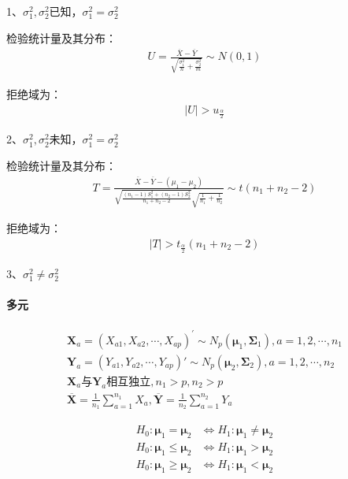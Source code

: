 \documentclass[12pt]{book}
\begin{document}
1、$\sigma_1^2,\sigma_2^2$已知，$\sigma_1^2=\sigma_2^2$

检验统计量及其分布：
\begin{gather*}
    U=\frac{\overline{X}-\overline{Y}}{\sqrt{\frac{\sigma_1^2}{n}+\frac{\sigma_2^2}{m}}}\sim N(0,1)
\end{gather*}


拒绝域为：
\begin{gather*}
    \left|U\right|>u_{\frac{\alpha}{2}}
\end{gather*}


2、$\sigma_1^2,\sigma_2^2$未知，$\sigma_1^2=\sigma_2^2$

检验统计量及其分布：
\begin{gather*}
    T=\frac{\overline{X}-\overline{Y}-(\mu_1-\mu_2)}{\sqrt{\frac{\left(n_1-1\right)S_1^2+\left(n_2-1\right)S_2^2}{n_1+n_2-2}}\sqrt{\frac{1}{n_1}+\frac{1}{n_2}}}\sim t(n_1+n_2-2)
\end{gather*}


拒绝域为：
\begin{gather*}
    \left|T\right|>t_{\frac{\alpha}{2}}(n_1+n_2-2)
\end{gather*}


3、$\sigma_1^2\neq\sigma_2^2$

\paragraph{多元}


\begin{gather*}
    \mathbf{X}_{a}=(X_{a1},X_{a2},\cdots,X_{ap})^\prime \sim N_p(\bm{\mu}_1,\bm{\Sigma}_1), a=1,2,\cdots,n_1\\
    \bm{Y}_a=\left(Y_{a1},Y_{a2},\cdots,Y_{ap}\right)' \sim N_p(\bm{\mu}_2,\mathbf{\Sigma}_2), a=1,2,\cdots,n_2 \\
    \mathbf{X}_{a}与\mathbf{Y}_a\text{相互独立}, n_1>p, n_2>p\\
    \overline{\bm{X}}=\frac{1}{n_1}\sum_{a=1}^{n_1}{X_a}, \overline{\bm{Y}}=\frac{1}{n_2}\sum_{a=1}^{n_2}{Y_a}
\end{gather*}



\begin{align*}
    H_0:\bm{\mu}_1=\bm{\mu}_2    & \Leftrightarrow H_1:\bm{\mu}_1\neq\bm{\mu}_2 \\
    H_0:\bm{\mu}_1\le\bm{\mu}_2  & \Leftrightarrow  H_1:\bm{\mu}_1>\bm{\mu}_2   \\
    H_0:\bm{\mu}_1\geq\bm{\mu}_2 & \Leftrightarrow H_1:\bm{\mu}_1<\bm{\mu}_2
\end{align*}
\end{document}
